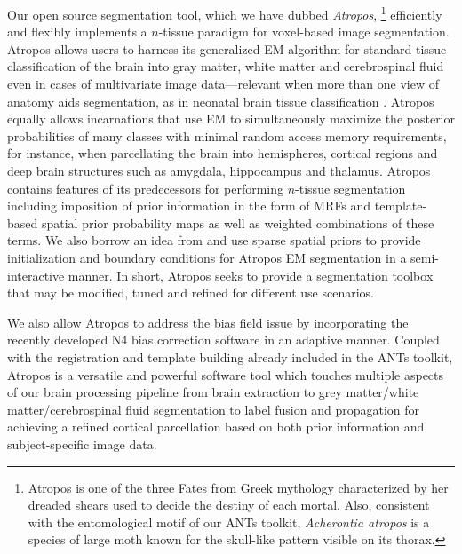 \documentclass[11pt,english]{article}
\begin{document}
Our open source segmentation tool, which we have dubbed {\em
Atropos},%
\footnote{Atropos is one of the three Fates from Greek
mythology characterized by her dreaded shears used to decide the
destiny of each mortal.  Also, consistent with the entomological motif
of our ANTs toolkit, {\it Acherontia atropos} is a species of large
moth known for the skull-like pattern visible on its thorax.  }
efficiently and flexibly implements a $n$-tissue paradigm for
voxel-based image segmentation.  Atropos allows users to harness its
generalized EM algorithm for standard tissue classification of
the brain into gray matter, white matter and cerebrospinal fluid even
in cases of multivariate image data---relevant when more than one 
view of anatomy aids segmentation, as in neonatal brain tissue classification
\citep[e.g.][]{Prastawa2005,Weisenfeld2009}.  
Atropos equally allows incarnations that use EM to simultaneously
maximize the posterior probabilities of many classes with minimal
random access memory requirements, for instance,
when parcellating the brain into hemispheres, cortical regions and
deep brain structures such as amygdala, hippocampus and
thalamus.  Atropos contains features of its predecessors for
performing $n$-tissue segmentation including imposition of prior
information in the form of MRFs and template-based spatial prior
probability maps as well as weighted combinations of these terms.  We
also borrow an idea from \cite{Boykov2004} and use sparse spatial
priors to provide initialization and boundary conditions for Atropos
EM segmentation in a semi-interactive manner.  In short, Atropos seeks
to provide a segmentation toolbox that may be modified,
tuned and refined for different use scenarios.

We also allow Atropos to address the bias field issue by incorporating
the recently developed N4 bias correction software \citep{Tustison2010} in an adaptive manner.  Coupled with the
registration \citep{Avants2010b} and template building 
\citep{Avants2010} already included in the ANTs toolkit, Atropos is a
versatile and powerful software tool which touches multiple aspects of
our brain processing pipeline from brain extraction
\citep{Avants2010a} to grey matter/white matter/cerebrospinal fluid
segmentation to label fusion and propagation for achieving a refined
cortical parcellation based on both prior information and
subject-specific image data.

\end{document}
